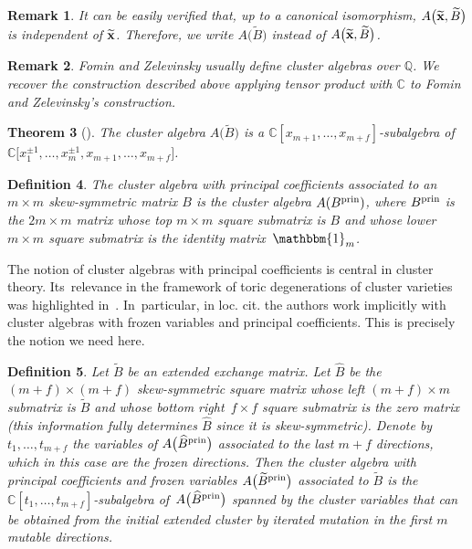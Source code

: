 \documentclass[pdftex]{sigma}%
\newtheorem{Theorem}{Theorem}[section]
\newtheorem{Definition}[Theorem]{Definition}
\newtheorem{Remark}[Theorem]{Remark}}
\numberwithin{equation}{section}
\begin{document}
\begin{Remark}
It can be easily verified that, up to a canonical isomorphism, $A\big(\widetilde{{\bf x}},\widetilde{B}\big)$ is independent of $\widetilde{{\bf x}}$. Therefore, we write $A\big(\widetilde{B}\big)$ instead of $A\big(\widetilde{{\bf x}},\widetilde{B}\big)$.
\end{Remark}

\begin{Remark}
Fomin and Zelevinsky usually define cluster algebras over $\mathbb Q$. We recover the construction described above applying tensor product with $\mathbb C$ to Fomin and Zelevinsky's construction.
\end{Remark}

\begin{Theorem}[{\cite[Laurent phenomenon]{FZ_clustersIV}}]
The cluster algebra $A\big(\widetilde{B}\big)$ is a $\mathbb C[x_{m+1},\dots , x_{m+f}]$-subalgebra of $\mathbb C\big[x_1^{\pm 1}, \dots , x_m^{\pm 1},x_{m+1},\dots , x_{m+f}\big]$.
\end{Theorem}


\begin{Definition}
The cluster algebra with {\it principal coefficients} associated to an $ m \times m$ skew-symmetric matrix $B$ is the cluster algebra $A(B^{\rm{prin}})$, where $B^{\rm{prin}}$ is the $2m \times m$ matrix whose top $m\times m$ square submatrix is $B$ and whose lower $m\times m$ square submatrix is the identity matrix~$\mathbbm{1}_m$.
\end{Definition}

The notion of cluster algebras with principal coefficients is central in cluster theory. Its~rele\-vance in the framework of toric degenerations of cluster varieties was highlighted in~\cite{GHKK}. In~particular, in loc. cit. the authors work implicitly with cluster algebras with frozen variables and principal coefficients. This is precisely the notion we need here.

\begin{Definition}
Let $ \widetilde{B}$ be an extended exchange matrix. Let $\widehat{B}$ be the $(m+f)\times (m+f)$ skew-symmetric square matrix whose left $(m+f)\times m$ submatrix is $\widetilde{B}$ and whose bottom right~$f \times f $ square submatrix is the zero matrix (this information fully determines $ \widehat{B}$ since it is skew-symmetric).
Denote by $t_1,\dots , t_{m+f}$ the variables of $A\big(\widehat{B}^{\rm prin}\big) $ associated to the last $m+f$ directions, which in this case are the frozen directions.
Then the {\it cluster algebra with principal coefficients and frozen variables} $A\big(\widetilde{B}^{\rm prin}\big) $ associated to $\widetilde{B}$ is the $\mathbb{C}[t_1,\dots , t_{m+f}]$-subalgebra of~$A\big(\widehat{B}^{\rm prin}\big)$ spanned by the cluster variables that can be obtained from the initial extended cluster by iterated mutation in the first $m$ mutable directions.
\end{Definition}
\end{document}
